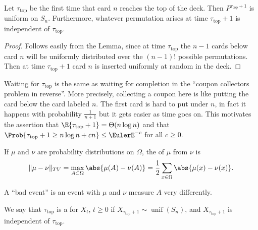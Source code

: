 \documentclass[12pt]{article}
\begin{document}
\begin{theorem}
    Let \( \tau_{\text{top}} \) be the first time that card \( n \)
    reaches the top of the deck.  Then \( P^{\tau_{\text{top}}+1} \) is
    uniform on \( S_n \).  Furthermore, whatever permutation arises at
    time \( \tau_{\text{top}}+1 \) is independent of \( \tau_{\text{top}}
    \).
\end{theorem}

\begin{proof}
    Follows easily from the Lemma, since at time \( \tau_{\text{top}} \)
    the \( n-1 \) cards below card \( n \) will be uniformly distributed
    over the \( (n-1)! \) possible permutations.  Then at time \( \tau_{\text
    {top}}+ 1 \) card \( n \) is inserted uniformly at random in the
    deck.
\end{proof}

\begin{remark}
    Waiting for \( \tau_{\text{top}} \) is the same as waiting for
    completion in the ``coupon collectors problem in reverse''.  More
    precisely, collecting a coupon here is like putting the card below
    the card labeled \( n \).  The first card is hard to put under \( n \),
    in fact it happens with probability \( \frac{1}{n+1} \) but it gets
    easier as time goes on.  This motivates the assertion that \( \E{\tau_
    {\text{top}} + 1} = \Theta(n \log n) \) and that \( \Prob{\tau_{\text
    {top}}+1 \ge n \log n + c n} \le \EulerE^{-c} \) for all \( c \ge 0 \).
\end{remark}

\begin{definition}
    If \( \mu \) and \( \nu \) are probability distributions on \(
    \Omega \), the  of \( \mu \) from \(
    \nu \) is%
    \[
        \| \mu - \nu \|_{TV} = \max_{A \subset \Omega} \abs{ \mu(A) -
        \nu(A)} = \frac{1}{2} \sum\limits_{x \in \Omega} \abs{ \mu(x) -
        \nu(x)}.
    \]
\end{definition}

\begin{remark}
    A ``bad event'' is an event with \( \mu \) and \( \nu \) measure \(
    A \) very differently.
\end{remark}

\begin{definition}
    We say that \( \tau_{\text{top}} \) is a %
    for \( X_t \), \( t \ge 0 \) if \( X_{\tau_{\text{top}}+1} \sim
    \operatorname{unif}
    (S_n) \), and \( X_{\tau_{\text{top}}+1} \) is independent of \(
    \tau_{\text{top}} \).
\end{definition}
\end{document}
